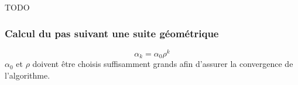 TODO

\subsubsection{Calcul du pas suivant une suite géométrique}

\begin{equation}
    \alpha_k = \alpha_0 \rho^k
\end{equation}
$\alpha_0$ et $\rho$ doivent être choisis suffisamment grands afin d'assurer la convergence de l'algorithme.